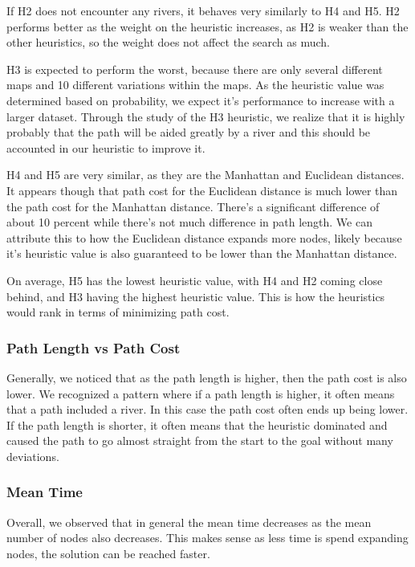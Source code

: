 If H2 does not encounter any rivers, it behaves very similarly to H4 and H5. H2 performs better as the weight on the heuristic increases, as H2 is weaker than the other heuristics, so the weight does not affect the search as much.

H3 is expected to perform the worst, because there are only several different maps and 10 different variations within the maps. As the heuristic value was determined based on probability, we expect it's performance to increase with a larger dataset. Through the study of the H3 heuristic, we realize that it is highly probably that the path will be aided greatly by a river and this should be accounted in our heuristic to improve it.

H4 and H5 are very similar, as they are the Manhattan and Euclidean distances. It appears though that path cost for the Euclidean distance is much lower than the path cost for the Manhattan distance. There's a significant difference of about 10 percent while there's not much difference in path length. We can attribute this to how the Euclidean distance expands more nodes, likely because it's heuristic value is also guaranteed to be lower than the Manhattan distance.

On average, H5 has the lowest heuristic value, with H4 and H2 coming close behind, and H3 having the highest heuristic value. This is how the heuristics would rank in terms of minimizing path cost.

\subsubsection{Path Length vs Path Cost}
Generally, we noticed that as the path length is higher, then the path cost is also lower. We recognized a pattern where if a path length is higher, it often means that a path included a river. In this case the path cost often ends up being lower. If the path length is shorter, it often means that the heuristic dominated and caused the path to go almost straight from the start to the goal without many deviations.

\subsubsection{Mean Time}
Overall, we observed that in general the mean time decreases as the mean number of nodes also decreases. This makes sense as less time is spend expanding nodes, the solution can be reached faster.


